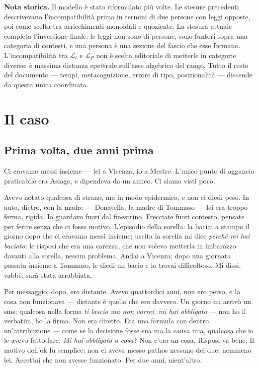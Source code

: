 \documentclass[
    oneside,                 %
    openany,                 %
    titlepage,
    11pt,
    a4paper,
    italian,
    DIV=14,                  %
    headinclude,
    footinclude=true,
    cleardoublepage=empty
]{scrbook}
\theoremstyle{ctplain}
\theoremstyle{ctdef}
\theoremstyle{ctrem}
\newcommand{\Lt}{\mathcal{L}_t}
\newcommand{\LP}{\mathcal{L}_P}
\begin{document}
\bigskip

\noindent\textbf{Nota storica.} Il modello è stato riformulato più volte. Le stesure precedenti descrivevano l'incompatibilità prima in termini di due persone con leggi opposte, poi come scelta tra arricchimenti monoidali e quoziente. La stesura attuale completa l'inversione finale: le leggi non sono di persone, sono funtori sopra una categoria di contesti, e una persona è una sezione del fascio che esse formano. L'incompatibilità tra $\Lt$ e $\LP$ non è scelta editoriale di metterle in categorie diverse: è massima distanza spettrale sull'asse algebrico del rango. Tutto il resto del documento --- tempi, metacognizione, errore di tipo, posizionalità --- discende da questa unica coordinata.

\clearpage

{\setlength{\parskip}{0pt}\tableofcontents}

\clearpage
{}
\pagestyle{scrheadings}

\part{Il caso}

\chapter{Prima volta, due anni prima}

{} Ci eravamo messi insieme --- lei a Vicenza, io a Mestre. L'unico punto di aggancio praticabile era Asiago, e dipendeva da un amico. Ci siamo visti poco.

Avevo notato qualcosa di strano, ma in modo epidermico, e non ci diedi peso. In auto, dietro, con la madre --- Donatella, la madre di Tommaso --- lei era troppo ferma, rigida. Io guardavo fuori dal finestrino. Frecciate fuori contesto, pensate per ferire senza che ci fosse motivo. L'episodio della sorella: la baciai a stampo il giorno dopo che ci eravamo messi insieme; uscita la sorella mi dice \emph{perché mi hai baciato}; le risposi che era una carezza, che non volevo metterla in imbarazzo davanti alla sorella, nessun problema. Andai a Vicenza; dopo una giornata passata insieme a Tommaso, le diedi un bacio e lo trovai difficoltoso. Mi dissi: vabbè, sarà stata arrabbiata.

Per messaggio, dopo, ero distante. Avevo quattordici anni, non ero perso, e la cosa non funzionava --- distante è quello che ero davvero. Un giorno mi arrivò un sms: qualcosa nella forma \emph{ti lascio ma non vorrei, mi hai obbligato} --- non ho il verbatim, ho la firma. Non era diretto. Era una formula con dentro un'attribuzione --- come se la decisione fosse sua ma la causa mia, qualcosa che io le avevo fatto fare. \emph{Mi hai obbligato a cosa?} Non c'era un cosa. Risposi va bene. Il motivo dell'ok fu semplice: non ci aveva messo pathos nessuno dei due, nemmeno lei. Accettai che non avesse funzionato. Per due anni, nient'altro.
\end{document}
